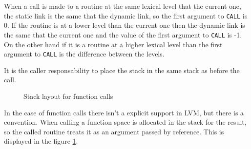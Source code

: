 \documentclass[a4paper, 11pt]{report}
\newcommand{\keyword}[1]{\texttt{#1}}
\begin{document}
When a call is made to a routine at the same lexical level that the current one, the static link is
the same that the dynamic link, so the first argument to \keyword{CALL} is 0. If the routine is at a
lower level than the current one then the dynamic link is the same that the current one and the value
of the first argument to \keyword{CALL} is -1. On the other hand if it is a routine at a higher lexical
level than the first argument to \keyword{CALL} is the difference between the levels.

It is the caller responsability to place the stack in the same stack as before the call.

\begin{figure}
\caption{Stack layout for function calls}
\label{fig:func}
\end{figure}

In the case of function calls there isn't a explicit support in LVM, but there is a convention. When calling
a function space is allocated in the stack for the result, so the called routine treats it as an argument
passed by reference. This is displayed in the figure \ref{fig:func}.
\end{document}

